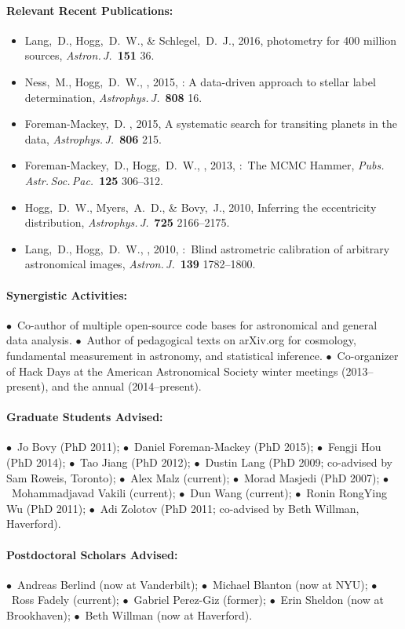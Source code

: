 \documentclass[12pt]{article}
\begin{document}
\paragraph{Relevant Recent Publications:}
\begin{itemize}\setlength{\itemsep}{0pt}
\item
Lang,~D., Hogg,~D.~W., \& Schlegel,~D.~J., 2016,
{ photometry for 400 million  sources},
\textit{Astron.\,J.}\ \textbf{151} 36.
\item
Ness,~M., Hogg,~D.~W., \etal, 2015,
{: A data-driven
approach to stellar label determination},
\textit{Astrophys.\,J.}\ \textbf{808} 16.
\item
Foreman-Mackey,~D. \etal, 2015,
{A systematic search for transiting planets in the  data},
\textit{Astrophys.\,J.}\ \textbf{806} 215.
\item
Foreman-Mackey,~D., Hogg,~D.~W., \etal, 2013,
{:\ The MCMC Hammer},
\textit{Pubs.\,Astr.\,Soc.\,Pac.}\ \textbf{125} 306--312.
\item
Hogg,~D.~W., Myers,~A.~D., \& Bovy,~J., 2010,
{Inferring the eccentricity distribution},
\textit{Astrophys.\,J.}\ \textbf{725} 2166--2175.
\item
Lang,~D., Hogg,~D.~W., \etal, 2010,
{:\ Blind astrometric calibration of arbitrary astronomical images},
\textit{Astron.\,J.}\ \textbf{139} 1782--1800.
\end{itemize}

\paragraph{Synergistic Activities:}
$\bullet$~Co-author of multiple open-source code bases for astronomical and general data analysis.
$\bullet$~Author of pedagogical texts on arXiv.org for cosmology, fundamental
measurement in astronomy, and statistical inference.
$\bullet$~Co-organizer of Hack Days at the American Astronomical Society winter meetings (2013--present), and
the annual  (2014--present).

\paragraph{Graduate Students Advised:}
$\bullet$~Jo Bovy (PhD 2011);
$\bullet$~Daniel Foreman-Mackey (PhD 2015);
$\bullet$~Fengji Hou (PhD 2014);
$\bullet$~Tao Jiang (PhD 2012);
$\bullet$~Dustin Lang (PhD 2009; co-advised by Sam Roweis, Toronto);
$\bullet$~Alex Malz (current);
$\bullet$~Morad Masjedi (PhD 2007);
$\bullet$~Mohammadjavad Vakili (current);
$\bullet$~Dun Wang (current);
$\bullet$~Ronin RongYing Wu (PhD 2011);
$\bullet$~Adi Zolotov (PhD 2011; co-advised by Beth Willman, Haverford).

\paragraph{Postdoctoral Scholars Advised:}
$\bullet$~Andreas Berlind (now at Vanderbilt);
$\bullet$~Michael Blanton (now at NYU);
$\bullet$~Ross Fadely (current);
$\bullet$~Gabriel Perez-Giz (former);
$\bullet$~Erin Sheldon (now at Brookhaven);
$\bullet$~Beth Willman (now at Haverford).
\end{document}
